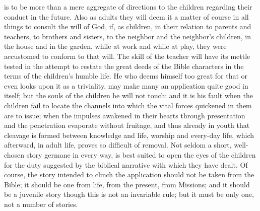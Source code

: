 is to be more than a mere aggregate of directions to the children regarding their conduct in the future. Also as adults they will deem it a matter of course in all things to consult the will of God, if, as children, in their relation to parents and teachers, to brothers and sisters, to the neighbor and the neighbor’s children, in the house and in the garden, while at work and while at play, they were accustomed to conform to that will. The skill of the teacher will have its mettle tested in the attempt to restate the great deeds of the Bible characters in the terms of the children’s humble life. He who deems himself too great for that or even looks upon it as a triviality, may make many an application quite good in itself; but the souls of the children he will not touch: and it is his fault when the children fail to locate the channels into which the vital forces quickened in them are to issue; when the impulses awakened in their hearts through presentation and the penetration evaporate without fruitage, and thus already in youth that cleavage is formed between knowledge and life, worship and every-day life, which afterward, in adult life, proves so difficult of removal. Not seldom a short, well-chosen story germane in every way, is best suited to open the eyes of the children for the duty suggested by the biblical narrative with which they have dealt. Of course, the story intended to clinch the application should not be taken from the Bible; it should be one from life, from the present, from Missions; and it should be a juvenile story though this is not an invariable rule; but it must be only one, not a number of stories.

